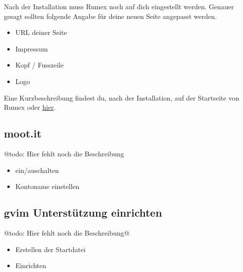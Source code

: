 \documentclass[%
fontsize=12pt,%
parskip=half,%
version=last%
]{scrreprt}
\begin{document}
Nach der Installation muss Rumex noch auf dich eingestellt werden.
Genauer gesagt sollten folgende Angabe für deine neuen Seite angepasst
werden.

\begin{itemize}
\itemsep1pt\parskip0pt
\item
  URL deiner Seite
\item
  Impressum
\item
  Kopf / Fusszeile
\item
  Logo
\end{itemize}

Eine Kurzbeschreibung findest du, nach der Installation, auf der
Startseite von Rumex oder \href{../istart.html}{hier}.

\subsection{moot.it}\label{moot.it}

@todo: Hier fehlt noch die Beschreibung

\begin{itemize}
\itemsep1pt\parskip0pt
\item
  ein/auschalten
\item
  Kontoname einstellen
\end{itemize}

\subsection{gvim Unterstützung
einrichten}\label{gvim-unterstuxfctzung-einrichten}

@todo: Hier fehlt noch die Beschreibung@

\begin{itemize}
\itemsep1pt\parskip0pt
\item
  Erstellen der Startdatei
\item
  Einrichten
\end{itemize}


\end{document}
